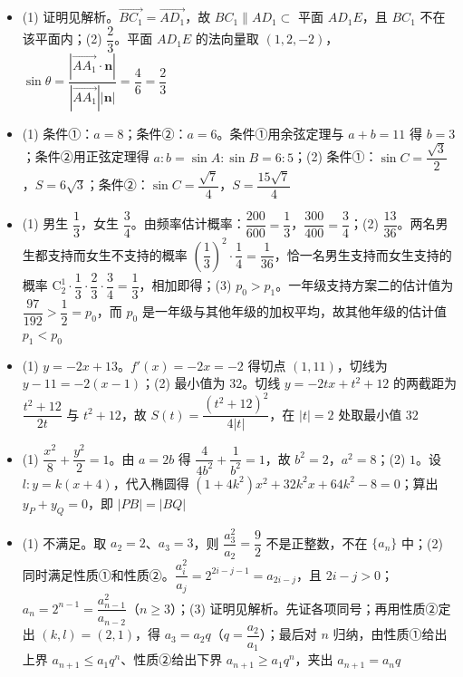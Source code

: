 \begin{itemize}[leftmargin=2.6em]
  \item[\textbf{16.}] (1) 证明见解析。$\overrightarrow{BC_1}=\overrightarrow{AD_1}$，故 $BC_1\parallel AD_1\subset$ 平面 $AD_1E$，且 $BC_1$ 不在该平面内；(2) $\dfrac23$。平面 $AD_1E$ 的法向量取 $(1,2,-2)$，$\sin\theta=\dfrac{|\overrightarrow{AA_1}\cdot\boldsymbol n|}{|\overrightarrow{AA_1}||\boldsymbol n|}=\dfrac46=\dfrac23$
  \item[\textbf{17.}] (1) 条件①：$a=8$；条件②：$a=6$。条件①用余弦定理与 $a+b=11$ 得 $b=3$；条件②用正弦定理得 $a:b=\sin A:\sin B=6:5$；(2) 条件①：$\sin C=\dfrac{\sqrt3}2$，$S=6\sqrt3$；条件②：$\sin C=\dfrac{\sqrt7}4$，$S=\dfrac{15\sqrt7}4$
  \item[\textbf{18.}] (1) 男生 $\dfrac13$，女生 $\dfrac34$。由频率估计概率：$\dfrac{200}{600}=\dfrac13$，$\dfrac{300}{400}=\dfrac34$；(2) $\dfrac{13}{36}$。两名男生都支持而女生不支持的概率 $\left(\dfrac13\right)^2\cdot\dfrac14=\dfrac1{36}$，恰一名男生支持而女生支持的概率 $\mathrm C_2^1\cdot\dfrac13\cdot\dfrac23\cdot\dfrac34=\dfrac13$，相加即得；(3) $p_0>p_1$。一年级支持方案二的估计值为 $\dfrac{97}{192}>\dfrac12=p_0$，而 $p_0$ 是一年级与其他年级的加权平均，故其他年级的估计值 $p_1<p_0$
  \item[\textbf{19.}] (1) $y=-2x+13$。$f'(x)=-2x=-2$ 得切点 $(1,11)$，切线为 $y-11=-2(x-1)$；(2) 最小值为 $32$。切线 $y=-2tx+t^2+12$ 的两截距为 $\dfrac{t^2+12}{2t}$ 与 $t^2+12$，故 $S(t)=\dfrac{(t^2+12)^2}{4|t|}$，在 $|t|=2$ 处取最小值 $32$
  \item[\textbf{20.}] (1) $\dfrac{x^2}8+\dfrac{y^2}2=1$。由 $a=2b$ 得 $\dfrac4{4b^2}+\dfrac1{b^2}=1$，故 $b^2=2$，$a^2=8$；(2) $1$。设 $l:y=k(x+4)$，代入椭圆得 $(1+4k^2)x^2+32k^2x+64k^2-8=0$；算出 $y_P+y_Q=0$，即 $|PB|=|BQ|$
  \item[\textbf{21.}] (1) 不满足。取 $a_2=2$、$a_3=3$，则 $\dfrac{a_3^2}{a_2}=\dfrac92$ 不是正整数，不在 $\{a_n\}$ 中；(2) 同时满足性质①和性质②。$\dfrac{a_i^2}{a_j}=2^{2i-j-1}=a_{2i-j}$，且 $2i-j>0$；$a_n=2^{n-1}=\dfrac{a_{n-1}^2}{a_{n-2}}$（$n\geqslant3$）；(3) 证明见解析。先证各项同号；再用性质②定出 $(k,l)=(2,1)$，得 $a_3=a_2q$（$q=\dfrac{a_2}{a_1}$）；最后对 $n$ 归纳，由性质①给出上界 $a_{n+1}\leqslant a_1q^n$、性质②给出下界 $a_{n+1}\geqslant a_1q^n$，夹出 $a_{n+1}=a_nq$
\end{itemize}
